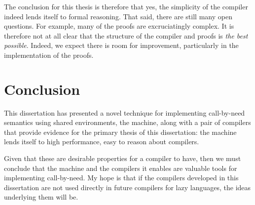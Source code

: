 The conclusion for this thesis is therefore that yes, the simplicity of the
compiler indeed lends itself to formal reasoning. That said, there are still
many open questions. For example, many of the proofs are excruciatingly complex.
It is therefore not at all clear that the structure of the compiler and proofs
is \emph{the best possible}. Indeed, we expect there is room for improvement,
particularly in the implementation of the proofs. 

\section{Conclusion}

This dissertation has presented a novel technique for implementing call-by-need
semantics using shared environments, the \ce machine, along with a pair of
compilers that provide evidence for the primary thesis of this dissertation: the
\ce machine lends itself to high performance, easy to reason about compilers. 

Given that these are desirable properties for a compiler to have, then we must
conclude that the \ce machine and the compilers it enables are valuable tools
for implementing call-by-need. My hope is that if the compilers developed in
this dissertation are not used directly in future compilers for lazy
languages, the ideas underlying them will be. 


